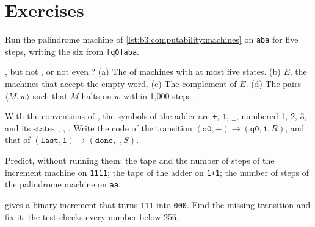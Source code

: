 \section{Exercises}\label{sec:b3:computability:exercises}

\begin{exercise}[$\star$]\label{exo:b3:computability:1}
Run the palindrome machine of \cref{lst:b3:computability:machines} on \texttt{aba} for five steps, writing the six  from \texttt{[q0]aba}.
\end{exercise}

\begin{exercise}[$\star$]\label{exo:b3:computability:2}
,  but not , or not even ? (a) The  of machines with at most five states. (b) $E$, the machines that accept the empty word. (c) The complement of $E$. (d) The pairs $\langle M, w \rangle$ such that $M$ halts on $w$ within 1,000 steps.
\end{exercise}

\begin{exercise}[$\star$]\label{exo:b3:computability:3}
With the conventions of , the symbols of the adder are \texttt{+}, \texttt{1}, \texttt{\_}, numbered 1, 2, 3, and its states , , . Write the code of the transition $(\mathtt{q0}, \mathtt{+}) \to (\mathtt{q0}, \mathtt{1}, R)$, and that of $(\mathtt{last}, \mathtt{1}) \to (\mathtt{done}, \mathtt{\_}, S)$.
\end{exercise}

\begin{exercise}[$\star$]\label{exo:b3:computability:4}
Predict, without running them: the tape and the number of steps of the increment machine on \texttt{1111}; the tape of the adder on \texttt{1+1}; the number of steps of the palindrome machine on \texttt{aa}.
\end{exercise}

\begin{exercise}[$\star\star$]\label{exo:b3:computability:5}
 gives a binary increment that turns \texttt{111} into \texttt{000}. Find the missing transition and fix it; the test checks every number below 256.
\end{exercise}


